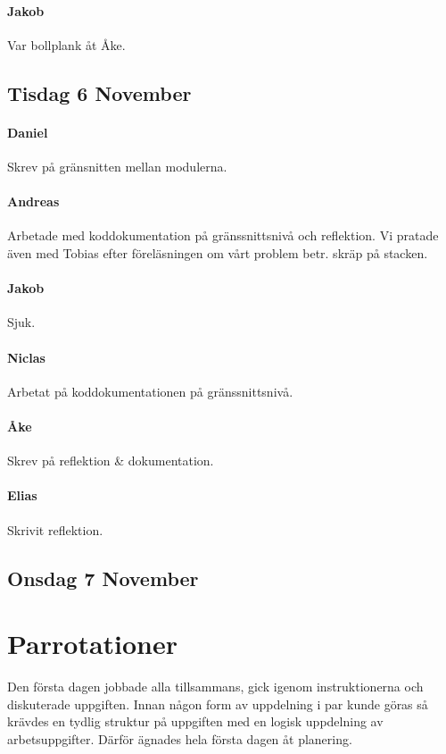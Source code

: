 \documentclass{article}
\begin{document}
\paragraph*{Jakob} Var bollplank åt Åke.

\subsection{Tisdag 6 November}
\paragraph*{Daniel} Skrev på gränsnitten mellan modulerna.

\paragraph*{Andreas} Arbetade med koddokumentation på gränssnittsnivå och reflektion. Vi pratade även med Tobias efter föreläsningen om vårt problem betr. skräp på stacken. 

\paragraph*{Jakob} Sjuk.

\paragraph*{Niclas} Arbetat på koddokumentationen på gränssnittsnivå.

\paragraph*{Åke} Skrev på reflektion \& dokumentation.

\paragraph*{Elias} Skrivit reflektion.

\subsection{Onsdag 7 November}

\section{Parrotationer}
Den första dagen jobbade alla tillsammans, gick igenom instruktionerna och diskuterade uppgiften. Innan någon form av uppdelning i par kunde göras så krävdes en tydlig struktur på uppgiften med en logisk uppdelning av arbetsuppgifter. Därför ägnades hela första dagen åt planering.
\end{document}
